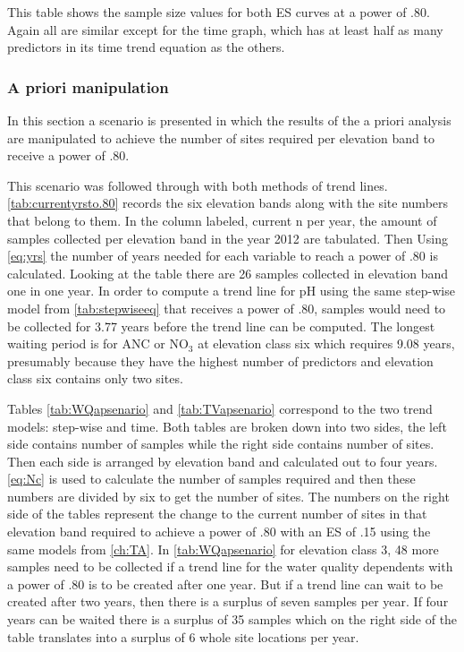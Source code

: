

This table shows the sample size values for both ES curves at a power of .80.
Again all are similar except for the time graph, which has at least half as many predictors in its time trend equation as the others.

\subsubsection{A priori manipulation}

In this section a scenario is presented in which the results of the a priori analysis are manipulated to achieve the number of sites required per elevation band to receive a power of .80.


This scenario was followed through with both methods of trend lines.
\autoref{tab:currentyrsto.80} records the six elevation bands along with the site numbers that belong to them. 
 In the column labeled, current n per year, the amount of samples collected per elevation band in the year 2012 are tabulated.  
 Then Using \autoref{eq:yrs} the number of years needed for each variable to reach a power of .80 is calculated.
Looking at the table there are 26  samples collected in elevation band one in one year.  
In order to compute a trend line for pH using the same step-wise model from \autoref{tab:stepwiseeq} that receives a power of .80,  samples would need to be collected for 3.77 years before the trend line can be computed.   
The longest waiting period is for ANC or NO$_3$ at elevation class six which requires 9.08 years, presumably because they have the highest number of predictors and elevation class six contains only two sites. 




Tables \autoref{tab:WQapsenario} and \autoref{tab:TVapsenario} correspond to the two trend models: step-wise and time.
Both tables are broken down into two sides, the left side contains number of samples while the right side contains number of sites.
Then each side is arranged by elevation band and calculated out to four years.
\autoref{eq:Nc} is used to calculate the number of samples required and then these numbers are divided by six to get the number of sites.
The numbers on the right side of the tables represent the change to the current number of sites in that elevation band required to achieve a power of .80 with an ES of .15 using the same models from \autoref{ch:TA}.
In \autoref{tab:WQapsenario} for elevation class 3, 48 more samples need to be collected if a trend line for the water quality dependents with a power of .80 is to be created after one year.  
But if a trend line can wait to be created after two years, then there is a surplus of seven samples per year.  
If four years can be waited there is a surplus of 35 samples which on the right side of the table translates into a surplus of 6 whole site locations per year.

